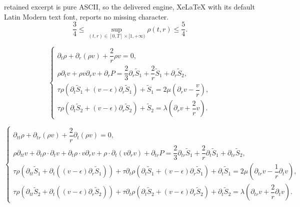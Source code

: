 \documentclass[10pt,a4paper]{amsart}
\begin{document}
retained excerpt is pure ASCII, so the delivered engine, XeLaTeX with its default Latin Modern text font, reports no missing character.
	\begin{equation}\label{hu3.4}
		\frac{3}{4} \leq \sup_{(t,r)\in[0,T]\times[1,+\infty)} \rho(t,r) \leq \frac{5}{4}.
	\end{equation}

	\begin{equation} \label{3.4}
		\begin{cases}
			\partial_t \rho+\partial_r(\rho v)+\dfrac{2}{r} \rho v=0, \\
			\rho\partial_t v+\rho v \partial_r v+\partial_r P=\dfrac{2}{3}\partial_r \tilde{S}_1 +\dfrac{2}{r} \tilde{S}_1+\partial_r \tilde{S}_2,\\
			\tau  \rho \left(\partial_t \tilde{S}_1+(v-\epsilon)\partial_r\tilde{S}_1 \right) +\tilde{S}_1=2\mu\left(\partial_r v- \dfrac{v}{r}\right)
			, \\
			\tau  \rho \left(\partial_t \tilde{S}_2+(v-\epsilon)\partial_r\tilde{S}_2 \right) +\tilde{S}_2=\lambda (\partial_r v+\dfrac{2}{r}v)
			.
		\end{cases}
	\end{equation}

		\begin{equation}
			\label{15}
			\begin{cases}
				\partial_{tt} \rho + \partial_{tr}(\rho v) + \dfrac{2}{r} \partial_t(\rho v) = 0, \\[6pt]
				
				\rho\partial_{tt} v + \partial_t \rho \cdot \partial_t v + \partial_t \rho \cdot v \partial_r v 
				+ \rho \cdot \partial_t( v \partial_r v) + \partial_{tr} P  = \dfrac{2}{3}\partial_{tr} \tilde{S}_1 + \dfrac{2}{r} \partial_t \tilde{S}_1 + \partial_{tr} \tilde{S}_2, \\[6pt]
				
				\tau \rho \left(\partial_{tt} \tilde{S}_1 + \partial_t ((v-\epsilon) \partial_r\tilde{S}_1) \right) 
				+ \tau \partial_t \rho \left(\partial_t \tilde{S}_1 + (v-\epsilon)\partial_r\tilde{S}_1 \right) 
				+ \partial_t \tilde{S}_1  = 2\mu\left(\partial_{tr} v - \dfrac{1}{r}\partial_t v \right), \\[6pt]
				
				\tau \rho \left(\partial_{tt} \tilde{S}_2 + \partial_t ((v-\epsilon)\partial_r\tilde{S}_2) \right) 
				+ \tau \partial_t \rho \left(\partial_t \tilde{S}_2 + (v-\epsilon)\partial_r\tilde{S}_2 \right) 
				+ \partial_t \tilde{S}_2  = \lambda \left(\partial_{tr} v + \dfrac{2}{r}\partial_t v\right).
			\end{cases}
		\end{equation}
\end{document}
